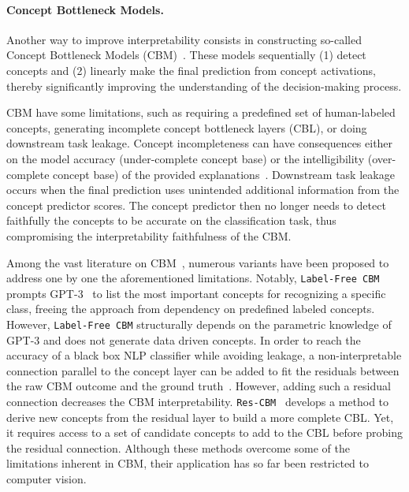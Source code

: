 \paragraph{Concept Bottleneck Models.}

Another way to improve interpretability
consists in constructing 
so-called Concept Bottleneck Models (CBM)~\cite{cbm_intro}. 
These models sequentially (1) detect concepts and (2) linearly make the final prediction from concept activations, thereby significantly improving the understanding of the decision-making process. 

CBM have some limitations, such as requiring a predefined set of human-labeled concepts, generating incomplete concept bottleneck layers (CBL), or doing downstream task leakage. Concept incompleteness can have consequences either on the model accuracy (under-complete concept base) or the intelligibility (over-complete concept base) of the provided explanations~\cite{cbm_incremental}. Downstream task leakage~\cite{addressing_leakage_cbm} occurs when the final prediction uses unintended additional information from the concept predictor scores. 
The concept predictor then no longer needs to  detect faithfully the concepts to be accurate on the classification task, thus compromising the interpretability faithfulness of the CBM. 

Among the vast literature on CBM~\cite{concept_survey}, numerous variants have been proposed to address one by one the aforementioned limitations. Notably, \texttt{Label-Free CBM}~\cite{label_free_cbm} prompts GPT-3~\cite{gpt3} to list the most important concepts for recognizing a specific class, freeing the approach from dependency on predefined labeled concepts. However, \texttt{Label-Free CBM} structurally depends on the parametric knowledge of GPT-3 and does not generate data driven concepts. In order to reach the accuracy of a black box NLP classifier while avoiding leakage, a non-interpretable connection parallel to the concept layer can be added to fit the residuals between the raw CBM outcome and the ground truth~\cite{cbm_posthoc, addressing_leakage_cbm}. However, adding such a residual connection decreases the CBM interpretability. \texttt{Res-CBM}~\cite{cbm_incremental} develops a method to derive new concepts from the residual layer to build a more complete CBL. Yet, it 
requires access to a set of candidate concepts to add to the CBL before probing the residual connection. Although these methods overcome some of the limitations inherent in CBM, their application has so far been restricted to computer vision. 



